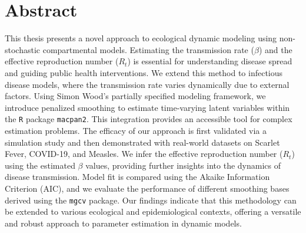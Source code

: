 \documentclass[
11pt, %
oneside, %
english, %
singlespacing, %
]{macthesis} %
\def\blankpage{%
      \clearpage%
      \thispagestyle{empty}%
      \addtocounter{page}{-1}%
      \null%
      \clearpage}
\begin{document}

\section*{\Huge Abstract}
\addchaptertocentry{\abstractname}
This thesis presents a novel approach to ecological dynamic modeling using non-stochastic compartmental models. Estimating the transmission rate (\(\beta\)) and the effective reproduction number (\(R_t\)) is essential for understanding disease spread and guiding public health interventions. We extend this method to infectious disease models, where the transmission rate varies dynamically due to external factors. Using Simon Wood's partially specified modeling framework, we introduce penalized smoothing to estimate time-varying latent variables within the \texttt{R} package \texttt{macpan2}. This integration provides an accessible tool for complex estimation problems. The efficacy of our approach is first validated via a simulation study and then demonstrated with real-world datasets on Scarlet Fever, COVID-19, and Measles. We infer the effective reproduction number (\(R_t\)) using the estimated \(\beta\) values, providing further insights into the dynamics of disease transmission. Model fit is compared using the Akaike Information Criterion (AIC), and we evaluate the performance of different smoothing bases derived using the \texttt{mgcv} package. Our findings indicate that this methodology can be extended to various ecological and epidemiological contexts, offering a versatile and robust approach to parameter estimation in dynamic models.
\blankpage
\clearpage

\end{document}
